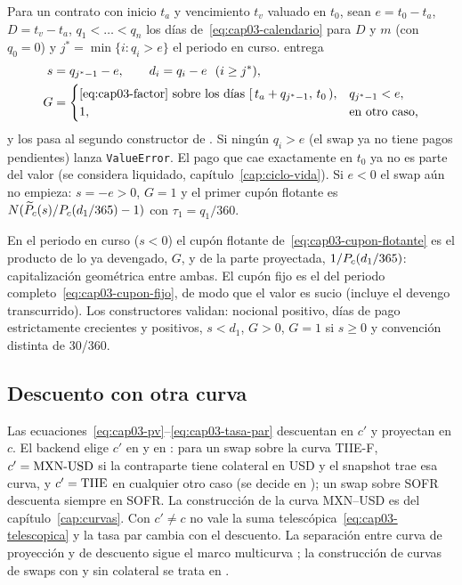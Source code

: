 Para un contrato con inicio $t_a$ y vencimiento $t_v$ valuado en $t_0$, sean $e=t_0-t_a$, $D=t_v-t_a$,
$q_1<\dots<q_n$ los días de~\eqref{eq:cap03-calendario} para $D$ y $m$ (con $q_0=0$) y
$j^\ast=\min\{i:q_i>e\}$ el periodo en curso.  entrega
\begin{align}
  s &= q_{j^\ast-1}-e, \qquad d_i=q_i-e\ \ (i\ge j^\ast),
  \label{eq:cap03-envejecido}\\
  G &= \begin{cases}
         \text{\eqref{eq:cap03-factor} sobre los días } [\,t_a+q_{j^\ast-1},\,t_0\,), & q_{j^\ast-1}<e,\\
         1, & \text{en otro caso,}
       \end{cases}
  \label{eq:cap03-g-envejecido}
\end{align}
y  los pasa al segundo constructor de
. Si ningún $q_i>e$ (el swap ya no tiene pagos
pendientes) lanza \texttt{ValueError}. El pago que cae exactamente en $t_0$ ya no es parte del valor
(se considera liquidado, capítulo~\ref{cap:ciclo-vida}). Si $e<0$ el swap aún no empieza: $s=-e>0$, $G=1$ y el
primer cupón flotante es $N(\widetilde P_c(s)/P_{c}(d_1/365)-1)$ con $\tau_1=q_1/360$.

En el periodo en curso ($s<0$) el cupón flotante de~\eqref{eq:cap03-cupon-flotante} es el producto de lo ya
devengado, $G$, y de la parte proyectada, $1/P_{c}(d_1/365)$: capitalización geométrica entre ambas. El cupón
fijo es el del periodo completo~\eqref{eq:cap03-cupon-fijo}, de modo que el valor es sucio (incluye el devengo
transcurrido). Los constructores validan: nocional positivo, días de pago estrictamente crecientes y positivos,
$s<d_1$, $G>0$, $G=1$ si $s\ge0$ y convención distinta de 30/360.

\subsection{Descuento con otra curva}\label{sec:cap03-colateral}

Las ecuaciones~\eqref{eq:cap03-pv}--\eqref{eq:cap03-tasa-par} descuentan en $c'$ y proyectan en $c$. El
backend elige $c'$ en  y en
: para un swap sobre la curva TIIE-F, $c'=\mathrm{MXN\text{-}USD}$ si la
contraparte tiene colateral en USD y el snapshot trae esa curva, y $c'=\mathrm{TIIE}$ en cualquier otro caso (se
decide en ); un swap sobre SOFR descuenta siempre en
SOFR. La construcción de la curva MXN--USD es del capítulo~\ref{cap:curvas}. Con $c'\ne c$ no vale la
suma telescópica~\eqref{eq:cap03-telescopica} y la tasa par cambia con el descuento. La separación entre curva
de proyección y de descuento sigue el marco multicurva \citep{ametrano2013}; la construcción de curvas de
swaps con y sin colateral se trata en \citet{fujii2009}.

